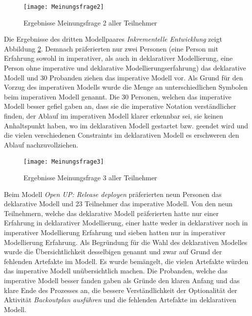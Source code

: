 \begin{figure}[htp]
\begin{center}
  \texttt{[image: Meinungsfrage2]} %
  \caption{Ergebnisse Meinungsfrage 2 aller Teilnehmer}
  \label{fig:Meinungsfrage2}
\end{center}
\end{figure}

Die Ergebnisse des dritten Modellpaares \textit{Inkrementelle Entwicklung} zeigt Abbildung \ref{fig:Meinungsfrage3}. Demnach präferierten nur zwei Personen (eine Person mit Erfahrung sowohl in imperativer, als auch in deklarativer Modellierung, eine Person ohne imperative und deklarative Modellierungserfahrung) das deklarative Modell und 30 Probanden ziehen das imperative Modell vor.\newline
Als Grund für den Vorzug des imperativen Modells wurde die Menge an unterschiedlichen Symbolen beim imperativen Modell genannt. \newline
Die 30 Personen, welchen das imperative Modell besser gefiel gaben an, dass sie die imperative Notation verständlicher finden, der Ablauf im imperativen Modell klarer erkennbar sei, sie keinen Anhaltspunkt haben, wo im deklarativen Modell gestartet bzw. geendet wird und die vielen verschiedenen Constraints im deklarativen Modell es erschweren den Ablauf nachzuvollziehen.\newline

\begin{figure}[htp]
\begin{center}
  \texttt{[image: Meinungsfrage3]} %
  \caption{Ergebnisse Meinungsfrage 3 aller Teilnehmer}
  \label{fig:Meinungsfrage3}
\end{center}
\end{figure}

Beim Modell \textit{Open UP: Release deployen} präferierten neun Personen das deklarative Modell und 23 Teilnehmer das imperative Modell. Von den neun Teilnehmern, welche das deklarative Modell präferierten hatte nur einer Erfahrung in deklarativer Modellierung, einer hatte weder in deklarativer noch in imperativer Modellierung Erfahrung und sieben hatten nur in imperativer Modellierung Erfahrung. \newline
Als Begründung für die Wahl des deklarativen Modelles wurde die Übersichtlichkeit desselbigen genannt und zwar auf Grund der fehlenden Artefakte im Modell. Es wurde bemängelt, die vielen Artefakte würden das imperative Modell unübersichtlich machen.\newline
Die Probanden, welche das imperative Modell besser fanden gaben als Gründe den klaren Anfang und das klare Ende des Prozesses an, die bessere Verständlichkeit der Optionalität der Aktivität \textit{Backoutplan ausführen} und die fehlenden Artefakte im deklarativen Modell. \newline



